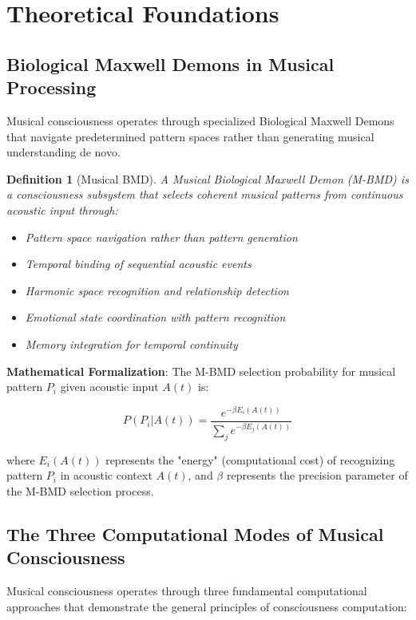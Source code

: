 \documentclass[12pt,a4paper]{article}
\newtheorem{definition}[theorem]{Definition}
\begin{document}
\section{Theoretical Foundations}

\subsection{Biological Maxwell Demons in Musical Processing}

Musical consciousness operates through specialized Biological Maxwell Demons that navigate predetermined pattern spaces rather than generating musical understanding de novo.

\begin{definition}[Musical BMD]
A Musical Biological Maxwell Demon (M-BMD) is a consciousness subsystem that selects coherent musical patterns from continuous acoustic input through:
\begin{itemize}
\item Pattern space navigation rather than pattern generation
\item Temporal binding of sequential acoustic events
\item Harmonic space recognition and relationship detection
\item Emotional state coordination with pattern recognition
\item Memory integration for temporal continuity
\end{itemize}
\end{definition}

\textbf{Mathematical Formalization}:
The M-BMD selection probability for musical pattern $P_i$ given acoustic input $A(t)$ is:

$$P(P_i | A(t)) = \frac{e^{-\beta E_i(A(t))}}{\sum_j e^{-\beta E_j(A(t))}}$$

where $E_i(A(t))$ represents the "energy" (computational cost) of recognizing pattern $P_i$ in acoustic context $A(t)$, and $\beta$ represents the precision parameter of the M-BMD selection process.

\subsection{The Three Computational Modes of Musical Consciousness}

Musical consciousness operates through three fundamental computational approaches that demonstrate the general principles of consciousness computation:
\end{document}
